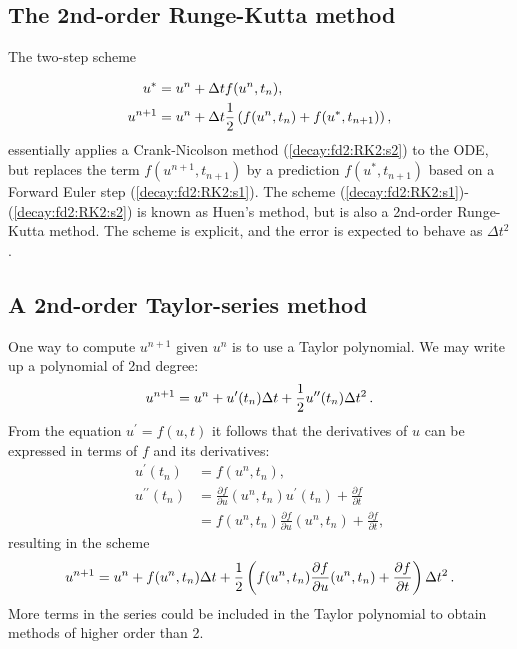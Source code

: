 \documentclass[%
oneside,                 %
final,                   %
10pt]{article}
\begin{document}
\subsection{The 2nd-order Runge-Kutta method}


The two-step scheme

\begin{align}
u^* &= u^n + \Delta t f(u^n, t_n),
\label{decay:fd2:RK2:s1}\\ 
u^{n+1} &= u^n + \Delta t \frac{1}{2} \left( f(u^n, t_n) + f(u^*, t_{n+1})
\right),
\label{decay:fd2:RK2:s2}
\end{align}
essentially applies a Crank-Nicolson method (\ref{decay:fd2:RK2:s2})
to the ODE, but replaces
the term $f(u^{n+1}, t_{n+1})$ by a prediction
$f(u^{*}, t_{n+1})$ based on a Forward Euler step (\ref{decay:fd2:RK2:s1}).
The scheme (\ref{decay:fd2:RK2:s1})-(\ref{decay:fd2:RK2:s2}) is
known as Huen's method, but is also a 2nd-order Runge-Kutta method.
The scheme is explicit, and the error is expected to behave as $\Delta t^2$.


\subsection{A 2nd-order Taylor-series method}


One way to compute $u^{n+1}$ given $u^n$ is to use a Taylor polynomial.
We may write up a polynomial of 2nd degree:
\[
u^{n+1} = u^n + u^{\prime}(t_n)\Delta t + {\frac{1}{2}}u^{\prime\prime}(t_n)\Delta t^2
\thinspace .
\]
From the equation $u^{\prime}=f(u,t)$ it follows that the derivatives of $u$
can be expressed in terms of $f$ and its derivatives:
\begin{align*}
u^{\prime}(t_n) &=f(u^n,t_n),\\ 
u^{\prime\prime}(t_n) &=
\frac{\partial f}{\partial u}(u^n,t_n) u^{\prime}(t_n) + \frac{\partial f}{\partial t}\\ 
&=  f(u^n,t_n)\frac{\partial f}{\partial u}(u^n,t_n)  +
\frac{\partial f}{\partial t},
\end{align*}
resulting in the scheme
\begin{equation}
u^{n+1} = u^n + f(u^n,t_n)\Delta t + \frac{1}{2}\left(
f(u^n,t_n)\frac{\partial f}{\partial u}(u^n,t_n)  +
\frac{\partial f}{\partial t}\right)\Delta t^2
\thinspace .
\label{decay:fd2:Taylor2}
\end{equation}
More terms in the series could be included in the Taylor polynomial to
obtain methods of higher order than 2.
\end{document}
